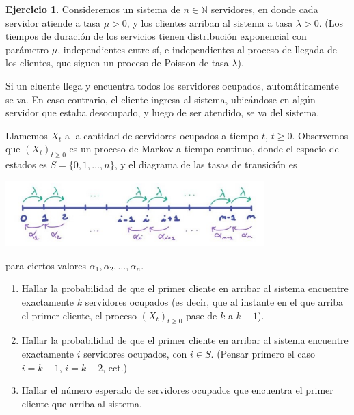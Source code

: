 \documentclass{article}
\newcommand{\naturalnum}{\mathbb{N}}
\theoremstyle{definition}
\newtheorem{exercise}{Ejercicio}
\begin{document}
\begin{exercise}
Consideremos un sistema de $n \in \naturalnum$ servidores, en donde cada servidor atiende a tasa $\mu > 0$, y los clientes arriban al sistema a tasa $\lambda > 0$.
(Los tiempos de duración de los servicios tienen distribución exponencial con parámetro $\mu$, independientes entre sí, e independientes al proceso de llegada de los clientes, que siguen un proceso de Poisson de tasa $\lambda$).

Si un cluente llega y encuentra todos los servidores ocupados, automáticamente se va.
En caso contrario, el cliente ingresa al sistema, ubicándose en algún servidor que estaba desocupado, y luego de ser atendido, se va del sistema.

Llamemos $X_t$ a la cantidad de servidores ocupados a tiempo $t$, $t \geq 0$.
Observemos que $(X_t)_{t \geq 0}$ es un proceso de Markov a tiempo continuo, donde el espacio de estados es $S = \{0, 1, \dots, n\}$, y el diagrama de las tasas de transición es
\begin{center}
\includegraphics[width=0.75\textwidth]{diagrama_de_las_tasas_de_transicion}
\end{center}
para ciertos valores $\alpha_1, \alpha_2, \dots, \alpha_n$.
\begin{enumerate}[label=\roman*.]
	\item Hallar la probabilidad de que el primer cliente en arribar al sistema encuentre exactamente $k$ servidores ocupados (es decir, que al instante en el que arriba el primer cliente, el proceso $(X_t)_{t \geq 0}$ pase de $k$ a $k + 1$).
	\item Hallar la probabilidad de que el primer cliente en arribar al sistema encuentre exactamente $i$ servidores ocupados, con $i \in S$.
(Pensar primero el caso $i = k - 1$, $i = k - 2$, ect.)
	\item Hallar el número esperado de servidores ocupados que encuentra el primer cliente que arriba al sistema.
\end{enumerate}
\end{exercise}
\end{document}
